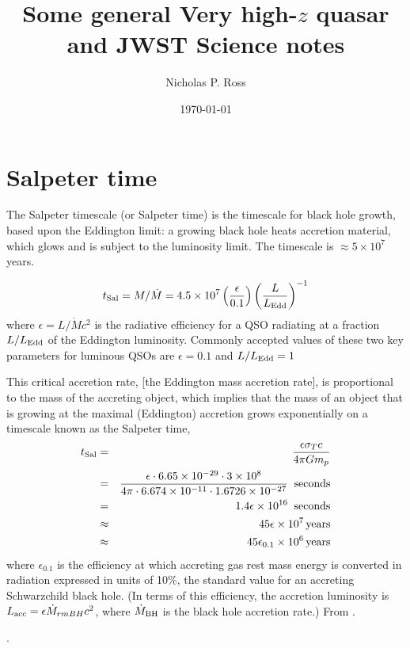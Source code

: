 \documentclass[11pt]{article}
\begin{document}
\title{Some general Very high-$z$ quasar and JWST Science notes} 
\author{Nicholas P. Ross}
\date{\today}
\maketitle


\section*{Salpeter time}
The Salpeter timescale (or Salpeter time) is the timescale for black
hole growth, based upon the Eddington limit: a growing black hole
heats accretion material, which glows and is subject to the luminosity
limit. The timescale is $\approx 5 \times 10^{7}$ years. 



\begin{equation}
  t_{\rm Sal} = M/\dot{M} = 4.5 \times10^{7} \left( \frac{\epsilon}{0.1}\right ) \left( \frac{L}{L_{\rm Edd}}\right )^{-1}
\end{equation}
where $\epsilon = L/\dot{M} c^{2}$ is the radiative efficiency for a
QSO radiating at a fraction $L/L_{\rm Edd}$ of the Eddington
luminosity. Commonly accepted values of these two key parameters for
luminous QSOs are $\epsilon= 0.1$ and $L/L_{\rm Edd} = 1$
\citep[e.g.,][]{Martini2004} 


This critical accretion rate, [the Eddington mass accretion rate], is
proportional to the mass of the accreting object, which implies that
the mass of an object that is growing at the maximal (Eddington)
accretion grows exponentially on a timescale known as the Salpeter
time,
\begin{eqnarray}
  t_{\rm Sal} & = &  \frac{\epsilon \sigma_{T} c}{4\pi G m_{p}}  \\
              & = & \frac{\epsilon \cdot 6.65\times10^{-29}     \cdot           3\times10^{8}}
                    {4\pi       \cdot  6.674\times10^{-11}  \cdot  1.6726\times10^{-27} }  \;\; {\rm seconds}\\
              & = & 1.4 \epsilon \times 10^{16} \;\; {\rm seconds}\\
               & \approx & 45 \epsilon \times  10^7 \, {\rm years} \\
                 & \approx & 45 \epsilon_{0.1}\times  10^6 \, {\rm years}
\end{eqnarray}
where $\epsilon_{0.1}$ is the efficiency at which accreting
gas rest mass energy is converted in radiation expressed in units of
10\%, the standard value for an accreting Schwarzchild black hole. (In
terms of this efficiency, the accretion luminosity is $L_{\rm acc} =
\epsilon \dot{M}_{rm BH} c^{2}$, where $\dot{M}_{\rm BH}$ is the black hole
accretion rate.)
From \citep{Coppi2003}.


\citet{Salpeter64}.


\clearpage


\end{document}

